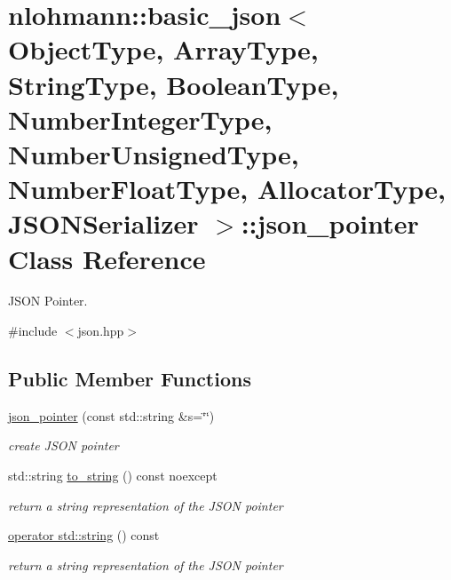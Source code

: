 \hypertarget{classnlohmann_1_1basic__json_1_1json__pointer}{}\section{nlohmann\+:\+:basic\+\_\+json$<$ Object\+Type, Array\+Type, String\+Type, Boolean\+Type, Number\+Integer\+Type, Number\+Unsigned\+Type, Number\+Float\+Type, Allocator\+Type, J\+S\+O\+N\+Serializer $>$\+:\+:json\+\_\+pointer Class Reference}
\label{classnlohmann_1_1basic__json_1_1json__pointer}


J\+S\+ON Pointer.  




{\ttfamily \#include $<$json.\+hpp$>$}

\subsection*{Public Member Functions}
\begin{DoxyCompactItemize}
\item 
\hyperlink{classnlohmann_1_1basic__json_1_1json__pointer_abaa66b0d30811b8a8670a673c686b75a}{json\+\_\+pointer} (const std\+::string \&s=\char`\"{}\char`\"{})
\begin{DoxyCompactList}\small\item\em create J\+S\+ON pointer \end{DoxyCompactList}\item 
std\+::string \hyperlink{classnlohmann_1_1basic__json_1_1json__pointer_adf63cdde9493796d8aa61bd948984b6d}{to\+\_\+string} () const noexcept
\begin{DoxyCompactList}\small\item\em return a string representation of the J\+S\+ON pointer \end{DoxyCompactList}\item 
\hyperlink{classnlohmann_1_1basic__json_1_1json__pointer_aeae296947e77ea9eb55c30d6a6379806}{operator std\+::string} () const 
\begin{DoxyCompactList}\small\item\em return a string representation of the J\+S\+ON pointer \end{DoxyCompactList}\end{DoxyCompactItemize}

